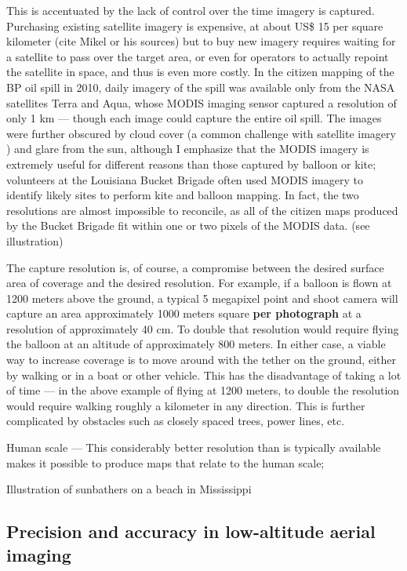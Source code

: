 \documentclass[11pt,oneside,notitlepage]{report}
\begin{document}
This is accentuated by the lack of control over the time imagery is captured. Purchasing existing satellite imagery is expensive, at about US\$ 15 per square kilometer (cite Mikel or his sources) but to buy new imagery requires waiting for a satellite to pass over the target area, or even for operators to actually repoint the satellite in space, and thus is even more costly. In the citizen mapping of the BP oil spill in 2010, daily imagery of the spill was available only from the NASA satellites Terra and Aqua, whose MODIS imaging sensor captured a resolution of only 1 km --- though each image could capture the entire oil spill. The images were further obscured by cloud cover (a common challenge with satellite imagery \cite{miyamoto2004use}) and glare from the sun, although I emphasize that the MODIS imagery is extremely useful for different reasons than those captured by balloon or kite; volunteers at the Louisiana Bucket Brigade often used MODIS imagery to identify likely sites to perform kite and balloon mapping. In fact, the two resolutions are almost impossible to reconcile, as all of the citizen maps produced by the Bucket Brigade fit within one or two pixels of the MODIS data. (see illustration)


The capture resolution is, of course, a compromise between the desired surface area of coverage and the desired resolution. For example, if a balloon is flown at 1200 meters above the ground, a typical 5 megapixel point and shoot camera will capture an area approximately 1000 meters square \textbf{per photograph} at a resolution of approximately 40 cm. To double that resolution would require flying the balloon at an altitude of approximately 800 meters. In either case, a viable way to increase coverage is to move around with the tether on the ground, either by walking or in a boat or other vehicle. This has the disadvantage of taking a lot of time --- in the above example of flying at 1200 meters, to double the resolution would require walking roughly a kilometer in any direction. This is further complicated by obstacles such as closely spaced trees, power lines, etc.

Human scale --- This considerably better resolution than is typically available makes it possible to produce maps that relate to the human scale; 

Illustration of sunbathers on a beach in Mississippi

\subsection{Precision and accuracy in low-altitude aerial imaging}
\label{subsec:precision}
\end{document}
